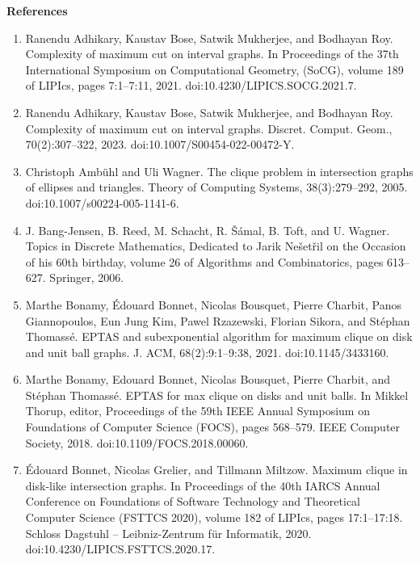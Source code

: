 \documentclass[10pt,a4paper]{amsart}
\begin{document}
\par
\par
\par
\par\medskip\noindent\textbf{References}\par
\begin{enumerate}
\item[]  [1]  Ranendu Adhikary, Kaustav Bose, Satwik Mukherjee, and Bodhayan Roy.  Complexity of maximum cut on interval graphs.  In Proceedings of the 37th International Symposium on Computational Geometry, (SoCG), volume 189 of LIPIcs, pages 7:1–7:11, 2021.  doi:10.4230/LIPICS.SOCG.2021.7.  
\item[]  [2]  Ranendu Adhikary, Kaustav Bose, Satwik Mukherjee, and Bodhayan Roy.  Complexity of maximum cut on interval graphs.  Discret. Comput. Geom., 70(2):307–322, 2023.  doi:10.1007/S00454-022-00472-Y.  
\item[]  [3]  Christoph Ambühl and Uli Wagner.  The clique problem in intersection graphs of ellipses and triangles.  Theory of Computing Systems, 38(3):279–292, 2005.  doi:10.1007/s00224-005-1141-6.  
\item[]  [4]  J. Bang-Jensen, B. Reed, M. Schacht, R. Šámal, B. Toft, and U. Wagner.  Topics in Discrete Mathematics, Dedicated to Jarik Nešetřil on the Occasion of his 60th birthday, volume 26 of Algorithms and Combinatorics, pages 613–627.  Springer, 2006.  
\item[]  [5]  Marthe Bonamy, Édouard Bonnet, Nicolas Bousquet, Pierre Charbit, Panos Giannopoulos, Eun Jung Kim, Pawel Rzazewski, Florian Sikora, and Stéphan Thomassé.  EPTAS and subexponential algorithm for maximum clique on disk and unit ball graphs.  J. ACM, 68(2):9:1–9:38, 2021.  doi:10.1145/3433160.  
\item[]  [6]  Marthe Bonamy, Edouard Bonnet, Nicolas Bousquet, Pierre Charbit, and Stéphan Thomassé.  EPTAS for max clique on disks and unit balls.  In Mikkel Thorup, editor, Proceedings of the 59th IEEE Annual Symposium on Foundations of Computer Science (FOCS), pages 568–579. IEEE Computer Society, 2018.  doi:10.1109/FOCS.2018.00060.  
\item[]  [7]  Édouard Bonnet, Nicolas Grelier, and Tillmann Miltzow.  Maximum clique in disk-like intersection graphs.  In Proceedings of the 40th IARCS Annual Conference on Foundations of Software Technology and Theoretical Computer Science (FSTTCS 2020), volume 182 of LIPIcs, pages 17:1–17:18. Schloss Dagstuhl – Leibniz-Zentrum für Informatik, 2020.  doi:10.4230/LIPICS.FSTTCS.2020.17.  

\end{enumerate}
\end{document}

